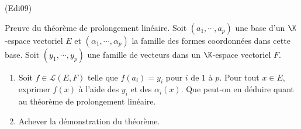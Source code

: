 \begin{tiny}(Edi09)\end{tiny} Preuve du théorème de prolongement linéaire.\newline
Soit $(a_1,\cdots,a_p)$ une base d'un $\K$-espace vectoriel $E$ et $(\alpha_1,\cdots,\alpha_p)$ la famille des formes coordonnées dans cette base. Soit $(y_1,\cdots,y_p)$ une famille de vecteurs dans un $\K$-espace vectoriel $F$.
\begin{enumerate}
 \item Soit $f\in \mathcal{L}(E,F)$ telle que $f(a_i)=y_i$ pour $i$ de $1$ à $p$. Pour tout $x\in E$, exprimer $f(x)$ à l'aide des $y_i$ et des $\alpha_i(x)$. Que peut-on en déduire quant au théorème de prolongement linéaire.
 \item Achever la démonstration du théorème.
\end{enumerate}

